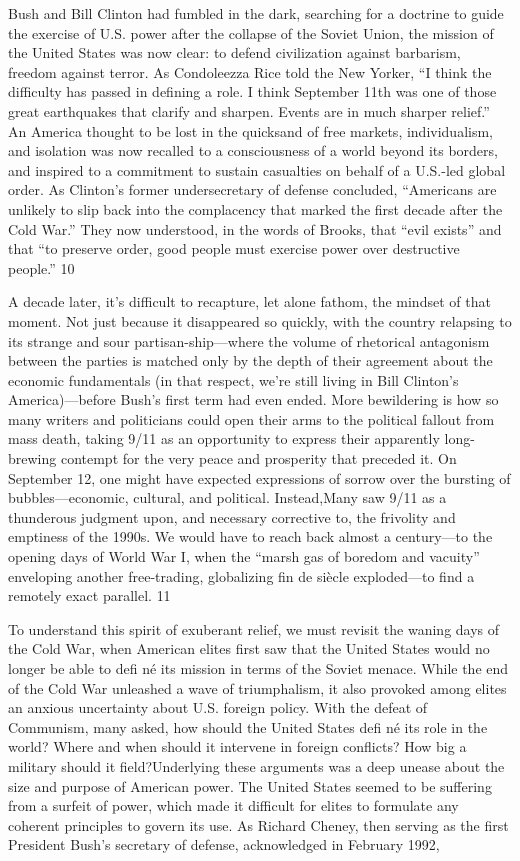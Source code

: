 Bush and Bill Clinton had fumbled in the dark, searching for a doctrine to guide the exercise of U.S. power after the collapse of the Soviet Union, the mission of the United States was now clear: to defend civilization against barbarism, freedom against terror. As Condoleezza Rice told the New Yorker, “I think the difficulty has passed in defining a role. I think September 11th was one of those great earthquakes that clarify and sharpen. Events are in much sharper relief.” An America thought to be lost in the quicksand of free markets, individualism, and isolation was now recalled to a consciousness of a world beyond its borders, and inspired to a commitment to sustain casualties on behalf of a U.S.-led global order. As Clinton’s former undersecretary of defense concluded, “Americans are unlikely to slip back into the complacency that marked the first decade after the Cold War.” They now understood, in the words of Brooks, that “evil exists” and that “to preserve order, good people must exercise power over destructive people.” {\color{blue} 10 } {\par} A decade later, it’s difficult to recapture, let alone fathom, the mindset of that moment. Not just because it disappeared so quickly, with the country relapsing to its strange and sour partisan-ship—where the volume of rhetorical antagonism between the parties is matched only by the depth of their agreement about the economic fundamentals (in that respect, we’re still living in Bill Clinton’s America)—before Bush’s first term had even ended. More bewildering is how so many writers and politicians could open their arms to the political fallout from mass death, taking 9/11 as an opportunity to express their apparently long-brewing contempt for the very peace and prosperity that preceded it. On September 12, one might have expected expressions of sorrow over the bursting of bubbles—economic, cultural, and political. Instead,Many saw 9/11 as a thunderous judgment upon, and necessary corrective to, the frivolity and emptiness of the 1990s. We would have to reach back almost a century—to the opening days of World War I, when the “marsh gas of boredom and vacuity” enveloping another free-trading, globalizing fin de siècle exploded—to find a remotely exact parallel. {\color{blue} 11 } {\par} To understand this spirit of exuberant relief, we must revisit the waning days of the Cold War, when American elites first saw that the United States would no longer be able to defi né its mission in terms of the Soviet menace. While the end of the Cold War unleashed a wave of triumphalism, it also provoked among elites an anxious uncertainty about U.S. foreign policy. With the defeat of Communism, many asked, how should the United States defi né its role in the world? Where and when should it intervene in foreign conflicts? How big a military should it field?Underlying these arguments was a deep unease about the size and purpose of American power. The United States seemed to be suffering from a surfeit of power, which made it difficult for elites to formulate any coherent principles to govern its use. As Richard Cheney, then serving as the first President Bush’s secretary of defense, acknowledged in February 1992, 